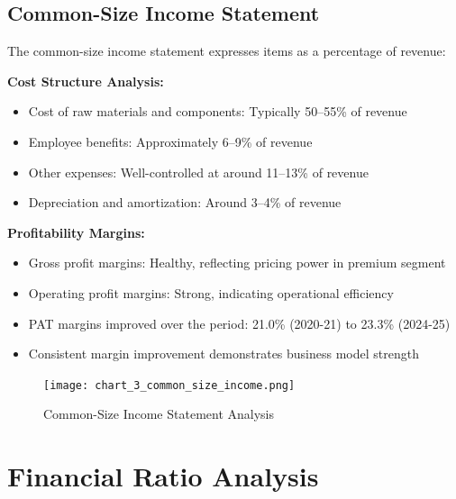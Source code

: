 \documentclass[8pt,a4paper]{article}
\begin{document}
\subsection{Common-Size Income Statement}

The common-size income statement expresses items as a percentage of revenue:

\textbf{Cost Structure Analysis:}
\begin{itemize}
    \item Cost of raw materials and components: Typically 50--55\% of revenue
    \item Employee benefits: Approximately 6--9\% of revenue
    \item Other expenses: Well-controlled at around 11--13\% of revenue
    \item Depreciation and amortization: Around 3--4\% of revenue
\end{itemize}
\newpage
\textbf{Profitability Margins:}
\begin{itemize}
    \item Gross profit margins: Healthy, reflecting pricing power in premium segment
    \item Operating profit margins: Strong, indicating operational efficiency
    \item PAT margins improved over the period: 21.0\% (2020-21) to 23.3\% (2024-25)
    \item Consistent margin improvement demonstrates business model strength
\end{itemize}


\begin{figure}[H]
\centering
\texttt{[image: chart\_3\_common\_size\_income.png]}
\caption{Common-Size Income Statement Analysis}
\label{fig:assets_growth}
\end{figure}

\section{Financial Ratio Analysis}
\end{document}
